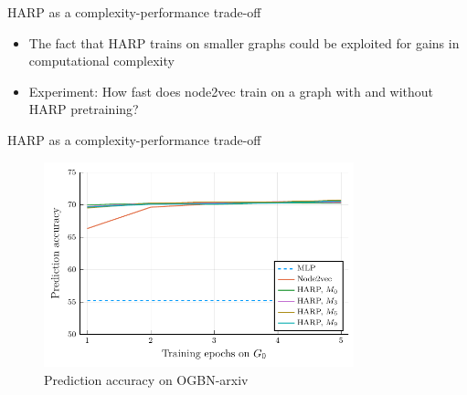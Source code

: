 \documentclass[10pt]{beamer}
\begin{document}
\begin{frame}{HARP as a complexity-performance trade-off}
	\begin{itemize}
		\item The fact that HARP trains on smaller graphs could be exploited for gains in computational complexity
		\item Experiment: How fast does node2vec train on a graph with and without HARP pretraining?
	\end{itemize}
\end{frame}

\begin{frame}{HARP as a complexity-performance trade-off}
	\begin{figure}
		\centering
		\includegraphics[width=0.8\textwidth]{images/steps_accur/steps_accur.pdf}
		\caption{Prediction accuracy on OGBN-arxiv}
	\end{figure}
\end{frame}

\begin{frame}
	\centering
\end{frame}
\end{document}
